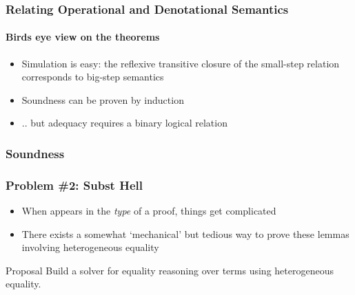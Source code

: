 \documentclass[dvipsnames,aspectratio=169,pdftex]{beamer}
\begin{document}
\begin{frame}[fragile]
  \frametitle{Relating Operational and Denotational Semantics}
  \framesubtitle{Birds eye view on the theorems}
    \vspace{5mm}
    \begin{itemize}
      \item Simulation is easy: the reflexive transitive closure of the small-step relation corresponds to big-step semantics
      \item Soundness can be proven by induction
      \item .. but adequacy requires a binary logical relation 
    \end{itemize}
\end{frame}

\begin{frame}[fragile]
  \frametitle{Soundness}
  \BigStepSoundnessType
  \SmallStepSoundness
  \vspace{-12.5mm} 
  \SmallStepSoundnessProofExcerpt
\end{frame}

\begin{frame}[fragile]
  \frametitle{Problem \#2: Subst Hell}
  \SubDefESub
  \vspace{-7.5mm} 
  \SubstExamplesFusionESubESub
  \vspace{-7.5mm} 
  \begin{itemize}
    \item When  appears in the \emph{type} of a proof, things get complicated
    \item There exists a somewhat `mechanical' but tedious way to prove these lemmas involving heterogeneous equality
  \end{itemize}
  \begin{exampleblock}{Proposal}
    Build a solver for equality reasoning over  terms using heterogeneous equality. 
  \end{exampleblock}
\end{frame}
\end{document}
